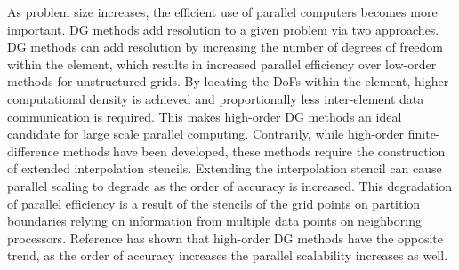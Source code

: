 As problem size increases, the efficient use of parallel computers becomes more important.  DG methods add resolution to a given problem via two approaches.  DG methods can add resolution by increasing the number of degrees of freedom within the element, which results in increased parallel efficiency over low-order methods for unstructured grids\cite{nastase07}.  By locating the DoFs within the element, higher computational density is achieved and proportionally less inter-element data communication is required.  This makes high-order DG methods an ideal candidate for large scale parallel computing.  Contrarily, while high-order finite-difference methods have been developed, these methods require the construction of extended interpolation stencils.  Extending the interpolation stencil can cause parallel scaling to degrade as the order of accuracy is increased.  This degradation of parallel efficiency is a result of the stencils of the grid points on partition boundaries relying on information from multiple data points on neighboring processors.  Reference \cite{nastase07} has shown that high-order DG methods have the opposite trend, as the order of accuracy increases the parallel scalability increases as well.      